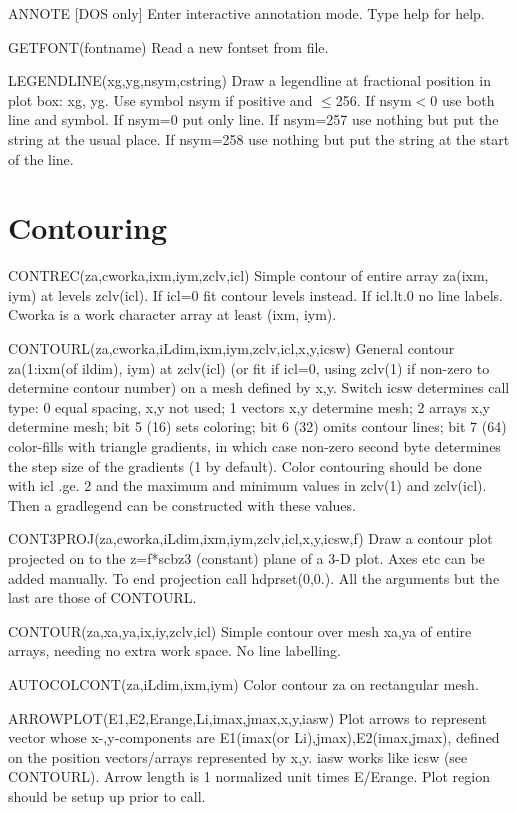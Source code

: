 \documentclass[12pt]{article}
\newif \iftth
\begin{document}
ANNOTE [DOS only] Enter interactive annotation mode. Type help for help.

GETFONT(fontname) Read a new fontset from file.

LEGENDLINE(xg,yg,nsym,cstring) Draw a legendline at fractional
position in plot box: xg, yg.  Use symbol nsym if positive and $\le$256.
If nsym$<$0 use both line and symbol. If nsym=0 put only line.  
If nsym=257 use nothing but put the string at the usual place.
If nsym=258 use nothing but put the string at the start of the line.

\section{Contouring}

\iftth \special{html:<a href="contest.f"><img align="right" src="contest.png"></a>}\fi

CONTREC(za,cworka,ixm,iym,zclv,icl) Simple contour of entire array za(ixm, iym)
at levels zclv(icl). If icl=0 fit contour levels instead. If icl.lt.0 no
line labels. Cworka is a work character array at least (ixm, iym).

CONTOURL(za,cworka,iLdim,ixm,iym,zclv,icl,x,y,icsw) General contour
za(1:ixm(of ildim), iym) at zclv(icl) (or fit if icl=0, using zclv(1)
if non-zero to determine contour number) on a mesh defined by
x,y. Switch icsw determines call type: 0 equal spacing, x,y not used;
1 vectors x,y determine mesh; 2 arrays x,y determine mesh; bit 5 (16)
sets coloring; bit 6 (32) omits contour lines; bit 7 (64) color-fills
with triangle gradients, in which case non-zero second byte determines
the step size of the gradients (1 by default). Color contouring should
be done with icl .ge. 2 and the maximum and minimum values in zclv(1)
and zclv(icl). Then a gradlegend can be constructed with these values.

CONT3PROJ(za,cworka,iLdim,ixm,iym,zclv,icl,x,y,icsw,f) Draw a contour
plot projected on to the z=f*scbz3 (constant) plane of a 3-D
plot. Axes etc can be added manually. To end projection call
hdprset(0,0.). All the arguments but the last are those of CONTOURL.

CONTOUR(za,xa,ya,ix,iy,zclv,icl) Simple contour over mesh xa,ya of entire
arrays, needing no extra work space. No line labelling.

AUTOCOLCONT(za,iLdim,ixm,iym) Color contour za on rectangular mesh.

ARROWPLOT(E1,E2,Erange,Li,imax,jmax,x,y,iasw) Plot arrows to represent
vector whose x-,y-components are E1(imax(or Li),jmax),E2(imax,jmax),
defined on the position vectors/arrays represented by x,y. iasw works
like icsw (see CONTOURL). Arrow length is 1 normalized unit times
E/Erange. Plot region should be setup up prior to
call.
\end{document}
